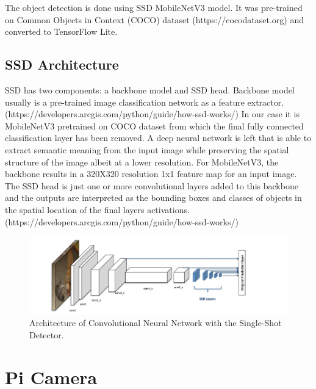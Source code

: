 \documentclass[runningheads]{llncs}
\begin{document}
The object detection is done using SSD MobileNetV3 model. It was pre-trained on Common Objects in Context (COCO) dataset (https://cocodataset.org) and converted to TensorFlow Lite.

\subsection{SSD Architecture} 

SSD has two components: a backbone model and SSD head. Backbone model usually is a pre-trained image classification network as a feature extractor.(https://developers.arcgis.com/python/guide/how-ssd-works/) In our case it is MobileNetV3 pretrained on  COCO dataset  from which the final fully connected classification layer has been removed. A deep neural network is left that is able to extract semantic meaning from the input image while preserving the spatial structure of the image albeit at a lower resolution. For MobileNetV3, the backbone results in a 320X320 resolution 1x1 feature map for an input image. The SSD head is just one or more convolutional layers added to this backbone and the outputs are interpreted as the bounding boxes and classes of objects in the spatial location of the final layers activations.(https://developers.arcgis.com/python/guide/how-ssd-works/)

\begin{figure}
\includegraphics[width=\textwidth]{SSD_Mobilenet.png}
\caption{Architecture of Convolutional Neural Network with the Single-Shot Detector.} \label{fig1}
\end{figure}

\section{Pi Camera}
\end{document}
